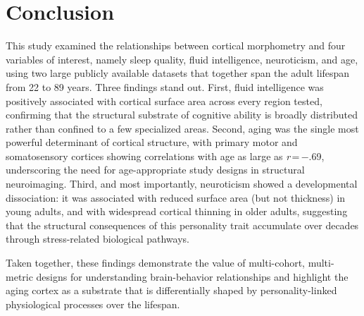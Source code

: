 
\section{Conclusion}
\label{sec:conclusion}

This study examined the relationships between cortical morphometry and four variables of interest, namely sleep quality, fluid intelligence, neuroticism, and age, using two large publicly available datasets that together span the adult lifespan from 22 to 89 years.
Three findings stand out.
First, fluid intelligence was positively associated with cortical surface area across every region tested, confirming that the structural substrate of cognitive ability is broadly distributed rather than confined to a few specialized areas.
Second, aging was the single most powerful determinant of cortical structure, with primary motor and somatosensory cortices showing correlations with age as large as \textit{r}\,=\,$-$.69, underscoring the need for age-appropriate study designs in structural neuroimaging.
Third, and most importantly, neuroticism showed a developmental dissociation: it was associated with reduced surface area (but not thickness) in young adults, and with widespread cortical thinning in older adults, suggesting that the structural consequences of this personality trait accumulate over decades through stress-related biological pathways.

Taken together, these findings demonstrate the value of multi-cohort, multi-metric designs for understanding brain-behavior relationships and highlight the aging cortex as a substrate that is differentially shaped by personality-linked physiological processes over the lifespan.
